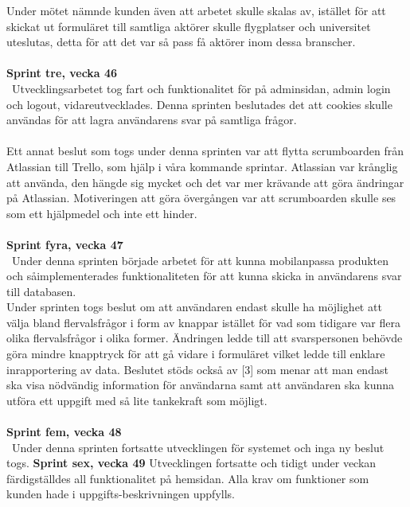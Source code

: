 \documentclass[12pt]{article}
\begin{document}
Under mötet nämnde kunden även att arbetet skulle skalas av, istället för att skickat ut formuläret till samtliga aktörer skulle flygplatser och universitet uteslutas, detta för att det var så pass få aktörer inom dessa branscher.
\\\\
\textbf{Sprint tre, vecka 46} \\\
Utvecklingsarbetet tog fart och funktionalitet för på adminsidan, admin login och logout,  vidareutvecklades. Denna sprinten beslutades det att cookies skulle användas för att lagra användarens svar på samtliga frågor.\\\\
Ett annat beslut som togs under denna sprinten var att flytta scrumboarden från Atlassian till Trello,  som hjälp i våra kommande sprintar. Atlassian var krånglig att använda, den hängde sig mycket och det var mer krävande att göra ändringar på Atlassian. Motiveringen att göra övergången var att scrumboarden skulle ses som ett hjälpmedel och inte ett hinder.\\\\
\textbf{Sprint fyra, vecka 47} \\\
Under denna sprinten började arbetet för att kunna mobilanpassa produkten och såimplementerades funktionaliteten för att kunna skicka in användarens svar till databasen. \\
Under sprinten togs beslut om att användaren endast skulle ha möjlighet att välja bland flervalsfrågor i form av knappar istället för vad som tidigare var flera olika flervalsfrågor i olika former. Ändringen ledde till att svarspersonen behövde göra mindre knapptryck för att gå vidare i formuläret vilket ledde till enklare inrapportering av data. Beslutet stöds också av [3] som menar att man endast ska visa nödvändig information för användarna samt att användaren ska kunna utföra ett uppgift med så lite tankekraft som möjligt.\\\\
\textbf{Sprint fem, vecka 48} \\\
Under denna sprinten fortsatte utvecklingen för systemet och inga ny beslut togs. 
\textbf{Sprint sex, vecka 49}
Utvecklingen fortsatte och tidigt under veckan färdigställdes all funktionalitet på hemsidan. Alla krav om funktioner som kunden hade i uppgifts-beskrivningen uppfylls.
\end{document}
